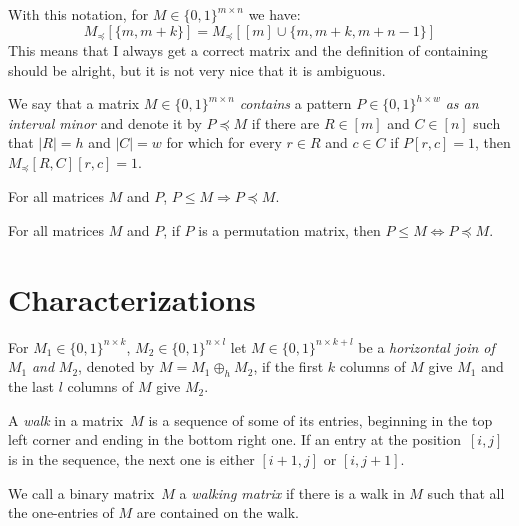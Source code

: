 \documentclass[12pt,a4paper]{report}
\begin{document}
With this notation, for $M\in\{0,1\}^{m\times n}$ we have: $$M_{\preceq}[\{m,m+k\}]=M_{\preceq}[[m]\cup\{m,m+k,m+n-1\}]$$ This means that I always get a correct matrix and the definition of containing should be alright, but it is not very nice that it is ambiguous.
\begin{defn}
We say that a matrix $M\in\{0,1\}^{m\times n}$ \emph{contains} a pattern $P\in\{0,1\}^{h\times w}$ \emph{as an interval minor} and denote it by $P\preceq M$ if there are $R\in[m]$ and $C\in[n]$ such that $|R|=h$ and $|C|=w$ for which for every $r\in R$ and $c\in C$ if $P[r,c]=1$, then $M_{\preceq}[R,C][r,c]=1$.
\end{defn}
\begin{obs}
For all matrices $M$ and $P$, $P\leq M\Rightarrow P\preceq M$.
\end{obs}
\begin{obs}
For all matrices $M$ and $P$, if $P$ is a permutation matrix, then $P\leq M\Leftrightarrow P\preceq M$.
\end{obs}

\section{Characterizations}
\begin{defn}
For $M_1\in\{0,1\}^{n\times k}$, $M_2\in\{0,1\}^{n\times l}$ let $M\in\{0,1\}^{n\times k+l}$ be a \emph{horizontal join of} $M_1$ \emph{and} $M_2$, denoted by $M=M_1\oplus_hM_2$, if the first $k$ columns of $M$ give $M_1$ and the last $l$ columns of $M$ give $M_2$.
\end{defn}
\begin{defn}
A \emph{walk} in a matrix~$M$ is a sequence of some of its entries, beginning in the top left corner and ending in the bottom right one. If an entry at the position~$[i,j]$ is in the sequence, the next one is either $[i+1,j]$ or $[i,j+1]$.
\end{defn}
\begin{defn}
We call a binary matrix~$M$ a \emph{walking matrix} if there is a walk in $M$ such that all the one-entries of $M$ are contained on the walk.
\end{defn}
\end{document}
